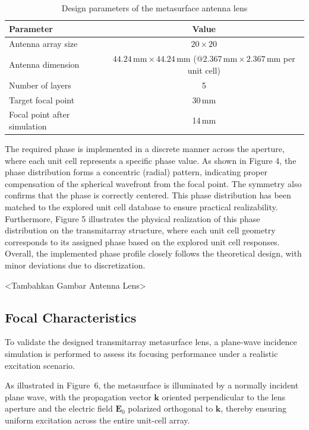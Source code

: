 \begin{table}[h!]
	\begin{center}
		\caption{Design parameters of the metasurface antenna lens}
		\label{table:lens_design_parameters}
		\begin{tabular}{|l|c|}
			\hline
			\textbf{Parameter} & \textbf{Value} \\
			\hline
			Antenna array size & $20 \times 20$ \\
			Antenna dimension & $44.24\,\text{mm} \times 44.24\,\text{mm}$ (@$2.367\,\text{mm} \times 2.367\,\text{mm}$ per unit cell) \\
			Number of layers & 5 \\
			Target focal point & 30\,mm \\
			Focal point after simulation & 14\,mm \\
			\hline
		\end{tabular}
	\end{center}
\end{table}

The required phase is implemented in a discrete manner across the aperture, where each unit cell represents a specific phase value.
As shown in Figure 4, the phase distribution forms a concentric (radial) pattern, indicating proper compensation of the spherical wavefront from the focal point. The symmetry also confirms that the phase is correctly centered. This phase distribution has been matched to the explored unit cell database to ensure practical realizability.
Furthermore, Figure 5 illustrates the physical realization of this phase distribution on the transmitarray structure, where each unit cell geometry corresponds to its assigned phase based on the explored unit cell responses.
Overall, the implemented phase profile closely follows the theoretical design, with minor deviations due to discretization.

<Tambahkan Gambar Antenna Lens>

\subsection{Focal Characteristics}
To validate the designed transmitarray metasurface lens, a plane-wave incidence simulation is performed to assess its focusing performance under a realistic excitation scenario.

As illustrated in Figure~6, the metasurface is illuminated by a normally incident plane wave, with the propagation vector $\mathbf{k}$ oriented perpendicular to the lens aperture and the electric field $\mathbf{E}_{0}$ polarized orthogonal to $\mathbf{k}$, thereby ensuring uniform excitation across the entire unit-cell array.

